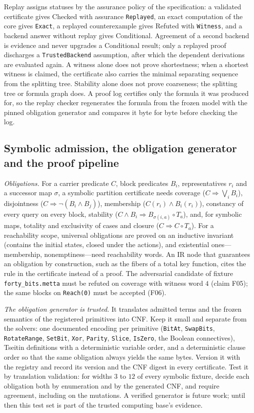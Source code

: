 \documentclass[11pt]{article}
\newcommand{\code}[1]{\texttt{#1}}
\begin{document}
Replay assigns statuses by the assurance policy of the specification: a validated certificate gives
Checked with assurance \code{Replayed}, an exact computation of the core gives \code{Exact}, a replayed
counterexample gives Refuted with \code{Witness}, and a backend answer without replay gives
Conditional. Agreement of a second backend is evidence and never upgrades a Conditional result; only
a replayed proof discharges a \code{TrustedBackend} assumption, after which the dependent derivations
are evaluated again. A witness alone does not prove shortestness; when a shortest witness is
claimed, the certificate also carries the minimal separating sequence from the splitting tree.
Stability alone does not prove
coarseness; the splitting tree or formula graph does. A proof log certifies only the formula it was
produced for, so the replay checker regenerates the formula from the frozen model with the pinned
obligation generator and compares it byte for byte before checking the log.

\subsection{Symbolic admission, the obligation generator and the proof pipeline}\label{sec:proofs}

\emph{Obligations.} For a carrier predicate $C$, block predicates $B_i$, representatives $r_i$ and a
successor map $\sigma$, a symbolic partition certificate needs coverage
($C\Rightarrow\bigvee_iB_i$), disjointness ($C\Rightarrow\neg(B_i\wedge B_j)$), membership
($C(r_i)\wedge B_i(r_i)$), constancy of every query on every block, stability
($C\wedge B_i\Rightarrow B_{\sigma(i,a)}\circ T_a$), and, for symbolic maps, totality and
exclusivity of cases and closure ($C\Rightarrow C\circ T_a$). For a reachability scope, universal
obligations are proved on an inductive invariant (contains the initial states, closed under the
actions), and existential ones---membership, nonemptiness---need reachability words. An IR node that
guarantees an obligation by construction, such as the fibers of a total key function, cites the rule
in the certificate instead of a proof. The adversarial candidate of fixture
\code{forty\_bits.metta} must be refuted on coverage with witness word $4$ (claim F05); the same blocks
on \code{Reach(0)} must be accepted (F06).

\emph{The obligation generator is trusted.} It translates admitted terms and the frozen semantics of
the registered primitives into CNF. Keep it small and separate from the solvers: one documented
encoding per primitive (\code{BitAt}, \code{SwapBits}, \code{RotateRange}, \code{SetBit},
\code{Xor}, \code{Parity}, \code{Slice}, \code{IsZero}, the Boolean connectives), Tseitin
definitions with a deterministic variable order, and a deterministic clause order so that the same
obligation always yields the same bytes. Version it with the registry and record its version and the
CNF digest in every certificate. Test it by translation validation: for widths $3$ to $12$ of every
symbolic fixture, decide each obligation both by enumeration and by the generated CNF, and require
agreement, including on the mutations. A verified generator is future work; until then this test
set is part of the trusted computing base's evidence.
\end{document}
